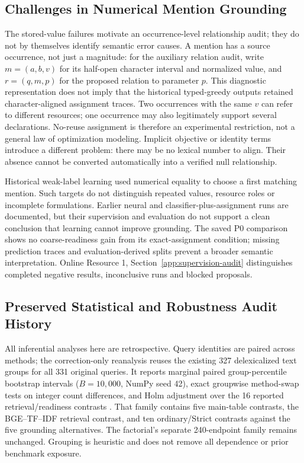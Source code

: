 \subsection{Challenges in Numerical Mention Grounding}
\label{app:occurrence-boundary}

The stored-value failures motivate an occurrence-level relationship audit; they do not by themselves identify semantic error causes. A mention has a source occurrence, not just a magnitude: for the auxiliary relation audit, write $m=(a,b,v)$ for its half-open character interval and normalized value, and $r=(q,m,p)$ for the proposed relation to parameter $p$. This diagnostic representation does not imply that the historical typed-greedy outputs retained character-aligned assignment traces. Two occurrences with the same $v$ can refer to different resources; one occurrence may also legitimately support several declarations. No-reuse assignment is therefore an experimental restriction, not a general law of optimization modeling. Implicit objective or identity terms introduce a different problem: there may be no lexical number to align. Their absence cannot be converted automatically into a verified null relationship.

Historical weak-label learning used numerical equality to choose a first matching mention. Such targets do not distinguish repeated values, resource roles or incomplete formulations. Earlier neural and classifier-plus-assignment runs are documented, but their supervision and evaluation do not support a clean conclusion that learning cannot improve grounding. The saved P0 comparison shows no coarse-readiness gain from its exact-assignment condition; missing prediction traces and evaluation-derived splits prevent a broader semantic interpretation. Online Resource 1, Section~\ref{app:supervision-audit} distinguishes completed negative results, inconclusive runs and blocked proposals.


\subsection{Preserved Statistical and Robustness Audit History}
\label{app:statistical-history}

All inferential analyses here are retrospective. Query identities are paired across methods; the correction-only reanalysis reuses the existing 327 delexicalized text groups for all 331 original queries. It reports marginal paired group-percentile bootstrap intervals ($B=10{,}000$, NumPy seed 42), exact groupwise method-swap tests on integer count differences, and Holm adjustment over the 16 reported retrieval/readiness contrasts \cite{holm1979followup}. That family contains five main-table contrasts, the BGE--TF--IDF retrieval contrast, and ten ordinary/Strict contrasts against the five grounding alternatives. The factorial's separate 240-endpoint family remains unchanged. Grouping is heuristic and does not remove all dependence or prior benchmark exposure.

